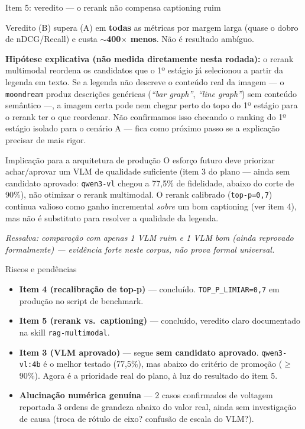 \documentclass{beamer}
\newenvironment{numerobloco}[1]{\begin{block}{#1}}{\end{block}}
\newenvironment{decisaobloco}[1]{\begin{alertblock}{#1}}{\end{alertblock}}
\begin{document}
\begin{frame}{Item 5: veredito — o rerank não compensa captioning ruim}
  \small
  \begin{decisaobloco}{Veredito}
    (B) supera (A) em \textbf{todas} as métricas por margem larga (quase o dobro de
    nDCG/Recall) e custa \textbf{$\sim$400$\times$ menos}. Não é resultado ambíguo.
  \end{decisaobloco}

  \pause
  \textbf{Hipótese explicativa (não medida diretamente nesta rodada):} o rerank
  multimodal reordena os candidatos que o 1º estágio já selecionou a partir da legenda
  em texto. Se a legenda não descreve o conteúdo real da imagem — o \texttt{moondream}
  produz descrições genéricas (\emph{``bar graph''}, \emph{``line graph''}) sem conteúdo
  semântico —, a imagem certa pode nem chegar perto do topo do 1º estágio para o rerank
  ter o que reordenar. Não confirmamos isso checando o ranking do 1º estágio isolado
  para o cenário A — fica como próximo passo se a explicação precisar de mais rigor.

  \pause
  \begin{numerobloco}{Implicação para a arquitetura de produção}
    O esforço futuro deve priorizar achar/aprovar um VLM de qualidade suficiente
    (item 3 do plano — ainda sem candidato aprovado: \texttt{qwen3-vl} chegou a 77,5\%
    de fidelidade, abaixo do corte de 90\%), não otimizar o rerank multimodal. O rerank
    calibrado (\texttt{top-p=0,7}) continua valioso como ganho incremental
    \emph{sobre} um bom captioning (ver item 4), mas não é substituto para resolver a
    qualidade da legenda.
  \end{numerobloco}

  \pause
  \footnotesize \textit{Ressalva: comparação com apenas 1 VLM ruim e 1 VLM bom (ainda
  reprovado formalmente) — evidência forte neste corpus, não prova formal universal.}
\end{frame}

\begin{frame}{Riscos e pendências}
  \begin{itemize}
    \item[\textcolor{green!50!black}{$\bullet$}] \textbf{Item 4 (recalibração de top-p)} —
      concluído. \texttt{TOP\_P\_LIMIAR=0,7} em produção no script de benchmark.
    \item[\textcolor{green!50!black}{$\bullet$}] \textbf{Item 5 (rerank vs.\ captioning)} —
      concluído, veredito claro documentado na skill \texttt{rag-multimodal}.
    \item[\textcolor{orange!80!black}{$\bullet$}] \textbf{Item 3 (VLM aprovado)} — segue
      \textbf{sem candidato aprovado}. \texttt{qwen3-vl:4b} é o melhor testado (77,5\%),
      mas abaixo do critério de promoção ($\geq$90\%). Agora é a prioridade real do
      plano, à luz do resultado do item 5.
    \item[\textcolor{red}{$\bullet$}] \textbf{Alucinação numérica genuína} — 2 casos
      confirmados de voltagem reportada 3 ordens de grandeza abaixo do valor real, ainda
      sem investigação de causa (troca de rótulo de eixo? confusão de escala do VLM?).
  \end{itemize}
\end{frame}
\end{document}
